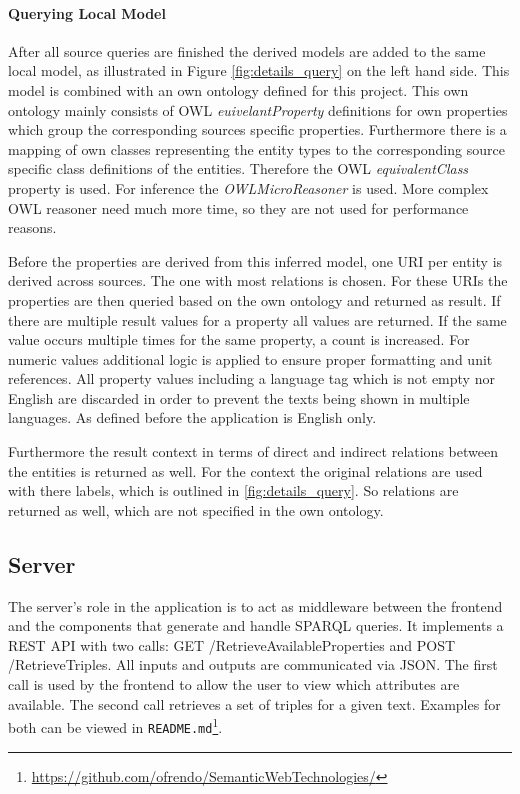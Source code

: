 \paragraph{Querying Local Model}
After all source queries are finished the derived models are added to the same local model, as illustrated in Figure \ref{fig:details_query} on the left hand side. This model is combined with an own ontology defined for this project. This own ontology mainly consists of OWL \textit{euivelantProperty} definitions for own properties which group the corresponding sources specific properties. Furthermore there is a mapping of own classes representing the entity types to the corresponding source specific class definitions of the entities. Therefore the OWL \textit{equivalentClass} property is used. For inference the \textit{OWLMicroReasoner} is used. More complex OWL reasoner need much more time, so they are not used for performance reasons. 

Before the properties are derived from this inferred model, one URI per entity is derived across sources. The one with most relations is chosen. 
For these URIs the properties are then queried based on the own ontology and returned as result. If there are multiple result values for a property all values are returned. If the same value occurs multiple times for the same property, a count is increased. For numeric values additional logic is applied to ensure proper formatting and unit references. All property values including a language tag which is not empty nor English are discarded in order to prevent the texts being shown in multiple languages. As defined before the application is English only. 

Furthermore the result context in terms of direct and indirect relations between the entities is returned as well. For the context the original relations are used with there labels, which is outlined in \ref{fig:details_query}. So relations are returned as well, which are not specified in the own ontology. 

\subsection{Server} 
\label{sec:server}
The server's role in the application is to act as middleware between the frontend and the components that generate and handle SPARQL queries. It implements a REST API with two calls: GET /RetrieveAvailableProperties and POST /RetrieveTriples. All inputs and outputs are communicated via JSON. The first call is used by the frontend to allow the user to view which attributes are available. The second call retrieves a set of triples for a given text. Examples for both can be viewed in \texttt{README.md}\footnote{\url{https://github.com/ofrendo/SemanticWebTechnologies/}}. 

